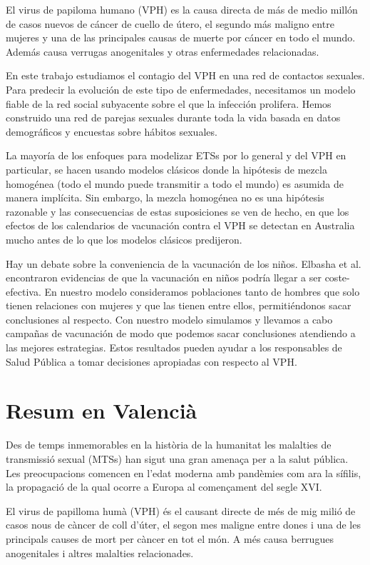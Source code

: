 El virus de papiloma humano (VPH) es la causa directa de m\'as de medio mill\'on de casos nuevos de c\'ancer de cuello de \'utero, el segundo m\'as maligno entre mujeres y una de las principales causas de muerte por c\'ancer en todo el mundo. Adem\'as causa verrugas anogenitales y otras enfermedades relacionadas.

En este trabajo estudiamos el contagio del VPH en una red de contactos sexuales. Para predecir la evoluci\'on de este tipo de enfermedades, necesitamos un modelo fiable de la red social subyacente sobre el que la infecci\'on prolifera. Hemos construido una red de parejas sexuales durante toda la vida basada en datos demogr\'aficos y encuestas sobre h\'abitos sexuales.

La mayor\'ia de los enfoques para modelizar ETSs por lo general y del VPH en particular, se hacen usando modelos cl\'asicos donde la hip\'otesis de mezcla homog\'enea (todo el mundo puede transmitir a todo el mundo) es asumida de manera impl\'icita. Sin embargo, la mezcla homog\'enea no es una hip\'otesis razonable y las consecuencias de estas suposiciones se ven de hecho, en que los efectos de los calendarios de vacunaci\'on contra el VPH se detectan en Australia mucho antes de lo que los modelos cl\'asicos predijeron.

Hay un debate sobre la conveniencia de la vacunaci\'on de los ni\~nos. Elbasha et al. encontraron evidencias de que la vacunaci\'on en ni\~nos podr\'ia llegar a ser coste-efectiva. En nuestro modelo consideramos poblaciones tanto de hombres que solo tienen relaciones con mujeres y que las tienen entre ellos, permiti\'endonos sacar conclusiones al respecto. Con nuestro modelo simulamos y llevamos a cabo campa\~nas de vacunaci\'on de modo que podemos sacar conclusiones atendiendo a las mejores estrategias. Estos resultados pueden ayudar a los responsables de Salud P\'ublica a tomar decisiones apropiadas con respecto al VPH.

\chapter*{Resum en Valenci\`a}
Des de temps inmemorables en la hist\`oria de la humanitat les malalties de transmissi\'o sexual (MTSs) han sigut una gran amena\c{c}a per a la salut p\'ublica. Les preocupacions comencen en l'edat moderna amb pand\`emies com ara la s\'ifilis, la propagaci\'o de la qual ocorre a Europa al comen\c{c}ament del segle XVI. 

El virus de papilloma hum\`a (VPH) \'es el causant directe de m\'es de mig mili\'o de casos nous de c\`ancer de coll d'\'uter, el segon mes maligne entre dones i una de les principals causes de mort per c\`ancer en tot el m\'on. A m\'es causa berrugues anogenitales i altres malalties relacionades. 

